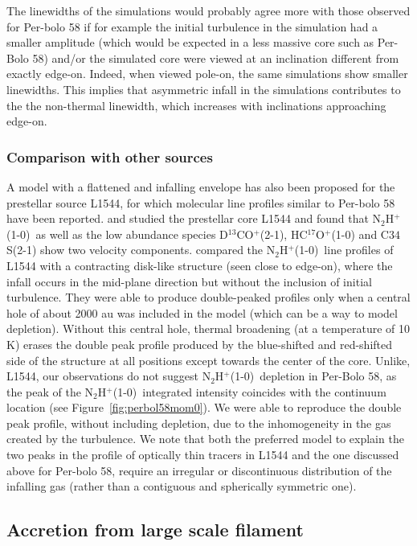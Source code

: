 \documentclass[iop]{emulateapj}
\newcommand{\nthp}{\mbox{\rm N$_2$H$^+$(1-0)}}
\begin{document}
The linewidths of the simulations would probably agree more with those observed for Per-bolo 58 if for example the initial turbulence in the simulation had a smaller amplitude (which would be expected in a less massive core such as Per-Bolo 58) and/or the simulated core were viewed at an inclination different from exactly edge-on. Indeed, when viewed pole-on, the same simulations show smaller linewidths. This implies that asymmetric infall in the simulations contributes to the the non-thermal linewidth, which increases with inclinations approaching edge-on.

\subsubsection{Comparison with other sources}

A model with a flattened and infalling envelope has also been proposed for the prestellar source L1544, for which molecular line profiles similar to Per-bolo 58 have been reported. \cite{1998TafallaL1544} and \cite{2002CaselliMolecular} studied the prestellar core L1544 and found that \nthp\ as well as the low abundance species D$^{13}$CO$^+$(2-1), HC$^{17}$O$^+$(1-0) and C$34$S(2-1) show two velocity components. \cite{2002CaselliMolecular} compared the \nthp\ line profiles of L1544 with a contracting disk-like structure (seen close to edge-on), where the infall occurs in the mid-plane direction but without the inclusion of initial turbulence. They were able to produce double-peaked profiles only when a central hole of about 2000 au was included in the model (which can be a way to model depletion). Without this central hole, thermal broadening (at a temperature of 10 K) erases the double peak profile produced by the blue-shifted and red-shifted side of the structure at all positions except towards the center of the core. Unlike, L1544, our observations do not suggest \nthp\ depletion in Per-Bolo 58, as the peak of the \nthp\ integrated intensity coincides with the continuum location (see Figure~\ref{fig:perbol58mom0}). We were able to reproduce the double peak profile, without including depletion, due to the inhomogeneity in the gas created by the turbulence.
We note that both the preferred model to explain the two peaks in the profile of optically thin tracers in L1544 and the one discussed above for Per-bolo 58, require an irregular or discontinuous distribution of the infalling gas (rather than a contiguous and spherically symmetric one).


\subsection{Accretion from large scale filament}
\end{document}

